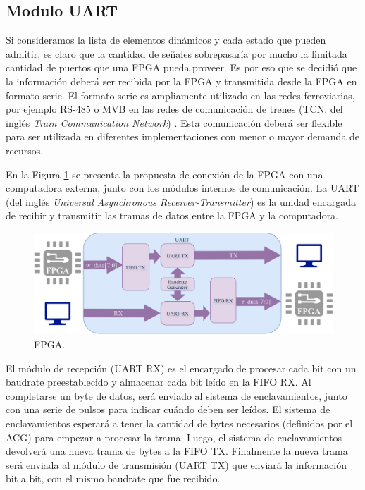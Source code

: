 \subsection{Modulo UART}
\label{sec:UART}
	Si consideramos la lista de elementos dinámicos y cada estado que pueden admitir, es claro que la cantidad de señales sobrepasaría por mucho la limitada cantidad de puertos que una FPGA pueda proveer. Es por eso que se decidió que la información deberá ser recibida por la FPGA y transmitida desde la FPGA en formato serie. El formato serie es ampliamente utilizado en las redes ferroviarias, por ejemplo RS-485 o MVB en las redes de comunicación de trenes (TCN, del inglés \textit{Train Communication Network}) \cite{TCN}. Esta comunicación deberá ser flexible para ser utilizada en diferentes implementaciones con menor o mayor demanda de recursos.
	
	En la Figura \ref{fig:GeneralCom} se presenta la propuesta de conexión de la FPGA con una computadora externa, junto con los módulos internos de comunicación.	La UART (del inglés \textit{Universal Asynchronous Receiver-Transmitter}) es la unidad encargada de recibir y transmitir las tramas de datos entre la FPGA y la computadora.
	
	\begin{figure}[H]
		\centering
		\includegraphics[width=1\textwidth]{Figuras/UART_module.png}
		\centering\caption{FPGA.}
		\label{fig:GeneralCom}
	\end{figure}
	
	El módulo de recepción (UART RX) es el encargado de procesar cada bit con un baudrate preestablecido y almacenar cada bit leído en la FIFO RX. Al completarse un byte de datos, será enviado al sistema de enclavamientos, junto con una serie de pulsos para indicar cuándo deben ser leídos. El sistema de enclavamientos esperará a tener la cantidad de bytes necesarios (definidos por el ACG) para empezar a procesar la trama. Luego, el sistema de enclavamientos devolverá una nueva trama de bytes a la FIFO TX. Finalmente la nueva trama será enviada al módulo de transmisión (UART TX) que enviará la información bit a bit, con el mismo baudrate que fue recibido.
		
